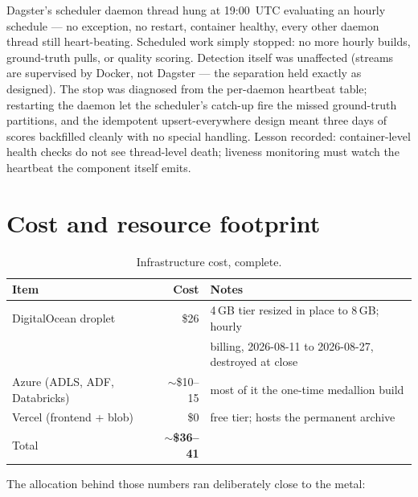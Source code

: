 \documentclass[11pt]{article}
\begin{document}
Dagster's scheduler daemon thread hung at 19:00~UTC evaluating an hourly
schedule --- no exception, no restart, container healthy, every other
daemon thread still heart-beating. Scheduled work simply stopped: no more
hourly builds, ground-truth pulls, or quality scoring. Detection itself was
unaffected (streams are supervised by Docker, not Dagster --- the
separation held exactly as designed). The stop was diagnosed from the
per-daemon heartbeat table; restarting the daemon let the scheduler's
catch-up fire the missed ground-truth partitions, and the idempotent
upsert-everywhere design meant three days of scores backfilled cleanly with
no special handling. Lesson recorded: container-level health checks do not
see thread-level death; liveness monitoring must watch the heartbeat the
component itself emits.

\section{Cost and resource footprint}

\begin{table}[H]
\centering
\small
\begin{tabular}{lrl}
\toprule
Item & Cost & Notes \\
\midrule
DigitalOcean droplet & \$26 & 4\,GB tier resized in place to 8\,GB; hourly \\
 & & billing, 2026-08-11 to 2026-08-27, destroyed at close \\
Azure (ADLS, ADF, Databricks) & ${\sim}$\$10--15 & most of it the one-time medallion build \\
Vercel (frontend + blob) & \$0 & free tier; hosts the permanent archive \\
\midrule
Total & \textbf{${\sim}$\$36--41} & \\
\bottomrule
\end{tabular}
\caption{Infrastructure cost, complete.}
\end{table}

The allocation behind those numbers ran deliberately close to the metal:
\end{document}

